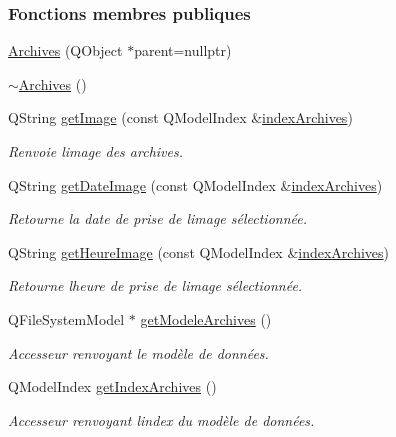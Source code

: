 \subsubsection*{Fonctions membres publiques}
\begin{DoxyCompactItemize}
\item 
\hyperlink{class_archives_ac30edd63c3f6c0df583bab7b9b9b4c76}{Archives} (Q\+Object $\ast$parent=nullptr)
\item 
\hyperlink{class_archives_a08c9ded9bb3da731991c5526dcdb2548}{$\sim$\+Archives} ()
\item 
Q\+String \hyperlink{class_archives_a9e35a0ff2d5823819cd2a9f8019c7b33}{get\+Image} (const Q\+Model\+Index \&\hyperlink{class_archives_a31cba52f3979585ee5e2b9390d21322b}{index\+Archives})
\begin{DoxyCompactList}\small\item\em Renvoie l\textquotesingle{}image des archives. \end{DoxyCompactList}\item 
Q\+String \hyperlink{class_archives_a5c1d731519acde8b59bc79973c4c1287}{get\+Date\+Image} (const Q\+Model\+Index \&\hyperlink{class_archives_a31cba52f3979585ee5e2b9390d21322b}{index\+Archives})
\begin{DoxyCompactList}\small\item\em Retourne la date de prise de l\textquotesingle{}image sélectionnée. \end{DoxyCompactList}\item 
Q\+String \hyperlink{class_archives_a91604a37aa9d4024ed79a71b12438003}{get\+Heure\+Image} (const Q\+Model\+Index \&\hyperlink{class_archives_a31cba52f3979585ee5e2b9390d21322b}{index\+Archives})
\begin{DoxyCompactList}\small\item\em Retourne l\textquotesingle{}heure de prise de l\textquotesingle{}image sélectionnée. \end{DoxyCompactList}\item 
Q\+File\+System\+Model $\ast$ \hyperlink{class_archives_ab5a55ac2e810cfdec3ce19af14087ceb}{get\+Modele\+Archives} ()
\begin{DoxyCompactList}\small\item\em Accesseur renvoyant le modèle de données. \end{DoxyCompactList}\item 
Q\+Model\+Index \hyperlink{class_archives_a3df83e6dd301afe331d7e75bd1b84a57}{get\+Index\+Archives} ()
\begin{DoxyCompactList}\small\item\em Accesseur renvoyant l\textquotesingle{}index du modèle de données. \end{DoxyCompactList}\item 

\end{DoxyCompactItemize}
